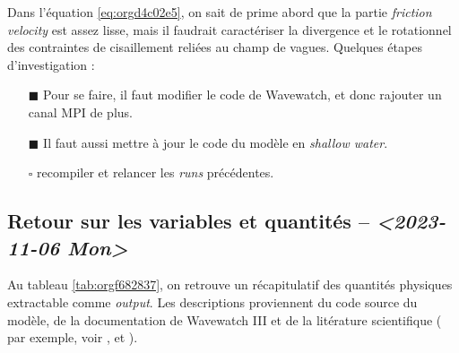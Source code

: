 \documentclass[10pt]{article}
\numberwithin{equation}{section}
\renewcommand{\boxtimes}{\blacksquare}
\begin{document}
Dans l'équation \ref{eq:orgd4c02e5}, on sait de prime abord que la partie \emph{friction velocity} est assez lisse, mais il faudrait caractériser la divergence et le rotationnel des contraintes de cisaillement reliées au champ de vagues.
Quelques étapes d'investigation : 
\begin{itemize}
\item[{$\boxtimes$}] Pour se faire, il faut modifier le code de Wavewatch, et donc rajouter un canal MPI de plus.
\item[{$\boxtimes$}] Il faut aussi mettre à jour le code du modèle en \emph{shallow water}.
\item[{$\square$}] recompiler et relancer les \emph{runs} précédentes.
\end{itemize}

\subsection{Retour sur les variables et quantités -- \textit{<2023-11-06 Mon>}}
\label{sec:org862388c}

Au tableau \ref{tab:orgf682837}, on retrouve un récapitulatif des quantités physiques extractable comme \emph{output}.
Les descriptions proviennent du code source du modèle, de la documentation de Wavewatch III et de la litérature scientifique ( par exemple, voir \Textcite{ardhuin2010semiempirical}, \autocite{couvelard2020development} et \textcite{wu_breivik_2019}).
\end{document}
